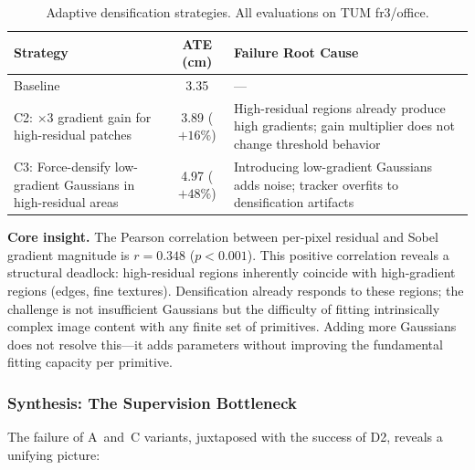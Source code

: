 \documentclass[conference]{IEEEtran}
\begin{document}
\begin{table}[htbp]
\caption{Adaptive densification strategies. All evaluations on TUM fr3/office.}
\label{tab:c_failures}
\begin{center}
\small
\setlength{\tabcolsep}{3pt}
\begin{tabular}{|>{\centering\arraybackslash}m{95pt}|c|>{\centering\arraybackslash}m{85pt}|}
\hline
\textbf{Strategy} & \textbf{ATE (cm)} & \textbf{Failure Root Cause} \\
\hline
Baseline & 3.35 & --- \\
\hline
C2: $\times$3 gradient gain for high-residual patches & 3.89 ($+16\%$) & High-residual regions already produce high gradients; gain multiplier does not change threshold behavior \\
\hline
C3: Force-densify low-gradient Gaussians in high-residual areas & 4.97 ($+48\%$) & Introducing low-gradient Gaussians adds noise; tracker overfits to densification artifacts \\
\hline
\end{tabular}
\end{center}
\end{table}

\textbf{Core insight.}
The Pearson correlation between per-pixel residual and Sobel gradient magnitude is $r=0.348$ ($p<0.001$).
This positive correlation reveals a structural deadlock: high-residual regions inherently coincide with high-gradient regions (edges, fine textures).
Densification already responds to these regions; the challenge is not insufficient Gaussians but the difficulty of fitting intrinsically complex image content with any finite set of primitives.
Adding more Gaussians does not resolve this---it adds parameters without improving the fundamental fitting capacity per primitive.

\subsubsection{Synthesis: The Supervision Bottleneck}

The failure of A~and~C variants, juxtaposed with the success of {D2}, reveals a unifying picture:
\end{document}
